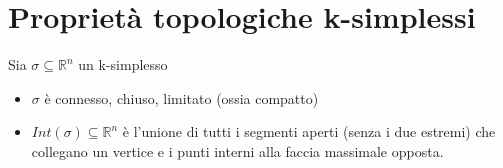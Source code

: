 \documentclass[a4paper]{report}
\newcommand{\R}{\ensuremath{\mathbb{R}}}
\begin{document}
\section{Proprietà topologiche k-simplessi}
Sia $\sigma\subseteq\R^n$ un k-simplesso
\begin{itemize}
    \item $\sigma$ è connesso, chiuso, limitato (ossia compatto)
    \item $Int(\sigma)\subseteq\R^n$ è l'unione di tutti i segmenti aperti (senza i due estremi) che collegano un vertice e i punti interni alla faccia massimale opposta.\\
          \begin{center}



              \begin{tikzpicture}[x=0.75pt,y=0.75pt,yscale=-1,xscale=1]


\end{tikzpicture}
\end{center}
\end{itemize}
\end{document}

